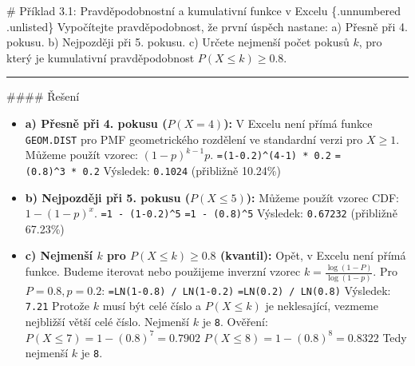 \documentclass[
  czech,
  11pt,
  letterpaper,
  DIV=11,
  numbers=noendperiod]{scrreprt}
\begin{document}
\begin{tcolorbox}[enhanced jigsaw, arc=.35mm, bottomrule=.15mm, bottomtitle=1mm, breakable, colback=white, colbacktitle=quarto-callout-note-color!10!white, colframe=quarto-callout-note-color-frame, coltitle=black, left=2mm, leftrule=.75mm, opacityback=0, opacitybacktitle=0.6, rightrule=.15mm, title=\textcolor{quarto-callout-note-color}{\faInfo}\hspace{0.5em}{Poznámka}, titlerule=0mm, toprule=.15mm, toptitle=1mm]

\# Příklad 3.1: Pravděpodobnostní a kumulativní funkce v Excelu
\{.unnumbered .unlisted\} Vypočítejte pravděpodobnost, že první úspěch
nastane: a) Přesně při 4. pokusu. b) Nejpozději při 5. pokusu. c) Určete
nejmenší počet pokusů \(k\), pro který je kumulativní pravděpodobnost
\(P(X \le k) \ge 0.8\).

\begin{center}\rule{0.5\linewidth}{0.5pt}\end{center}

\#\#\#\# Řešení

\begin{itemize}
\item
  \textbf{a) Přesně při 4. pokusu (\(P(X=4)\)):} V Excelu není přímá
  funkce \texttt{GEOM.DIST} pro PMF geometrického rozdělení ve
  standardní verzi pro \(X \ge 1\). Můžeme použít vzorec:
  \((1-p)^{k-1}p\). \texttt{=(1-0.2)\^{}(4-1)\ *\ 0.2}
  \texttt{=(0.8)\^{}3\ *\ 0.2} Výsledek: \texttt{0.1024} (přibližně
  10.24\%)
\item
  \textbf{b) Nejpozději při 5. pokusu (\(P(X \le 5)\)):} Můžeme použít
  vzorec CDF: \(1-(1-p)^x\). \texttt{=1\ -\ (1-0.2)\^{}5}
  \texttt{=1\ -\ (0.8)\^{}5} Výsledek: \texttt{0.67232} (přibližně
  67.23\%)
\item
  \textbf{c) Nejmenší \(k\) pro \(P(X \le k) \ge 0.8\) (kvantil):} Opět,
  v Excelu není přímá funkce. Budeme iterovat nebo použijeme inverzní
  vzorec \(k = \frac{\log(1 - P)}{\log(1 - p)}\). Pro \(P=0.8, p=0.2\):
  \texttt{=LN(1-0.8)\ /\ LN(1-0.2)} \texttt{=LN(0.2)\ /\ LN(0.8)}
  Výsledek: \texttt{7.21} Protože \(k\) musí být celé číslo a
  \(P(X \le k)\) je neklesající, vezmeme nejbližší větší celé číslo.
  Nejmenší \(k\) je \texttt{8}. Ověření:
  \(P(X \le 7) = 1 - (0.8)^7 = 0.7902\)
  \(P(X \le 8) = 1 - (0.8)^8 = 0.8322\) Tedy nejmenší \(k\) je
  \texttt{8}.
\end{itemize}

\end{tcolorbox}
\end{document}

